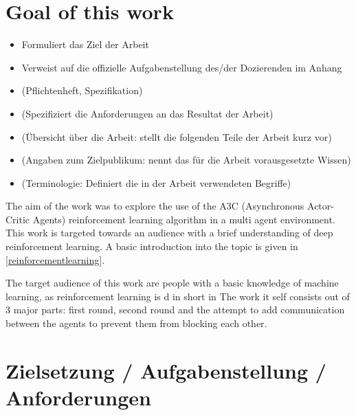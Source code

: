 \section{Goal of this work}\label{zielsetzung}
\begin{itemize}
\item Formuliert das Ziel der Arbeit
\item Verweist auf die offizielle Aufgabenstellung des/der Dozierenden im Anhang
\item (Pflichtenheft, Spezifikation)
\item (Spezifiziert die Anforderungen an das Resultat der Arbeit)
\item (Übersicht über die Arbeit: stellt die folgenden Teile der Arbeit kurz vor)
\item (Angaben zum Zielpublikum: nennt das für die Arbeit vorausgesetzte Wissen)
\item (Terminologie: Definiert die in der Arbeit verwendeten Begriffe)
\end{itemize}

The aim of the work was to explore the use of the A3C (Asynchronous Actor-Critic Agents) reinforcement learning algorithm in a multi agent environment.\\
This work is targeted towards an audience with a brief understanding of deep reinforcement learning. A basic introduction into the topic is given in \autoref{reinforcementlearning}.

The target audience of this work are people with a basic knowledge of machine learning, as reinforcement learning is d in short in %
The work it self consists out of 3 major parts: first round, second round and the attempt to add communication between the agents to prevent them from blocking each other. \\


\section{Zielsetzung / Aufgabenstellung / Anforderungen}\label{zielsetzung}



